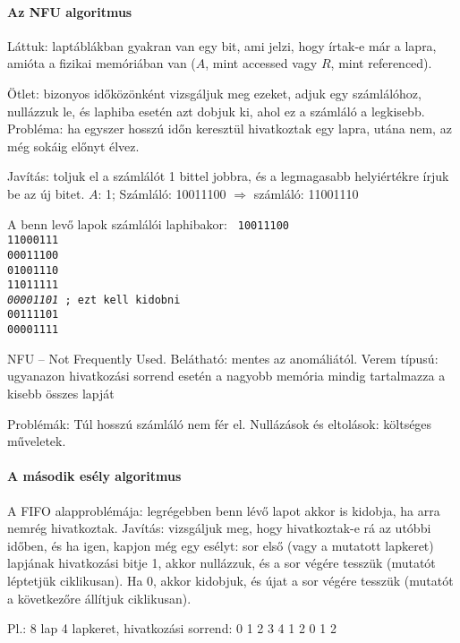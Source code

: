 \documentclass[fleqn,10pt,a4paper]{article}
\newcommand{\nn}{\Rightarrow}
\theoremstyle{magyar}
\begin{document}
  \paragraph{Az NFU algoritmus}
  
  Láttuk: laptáblákban gyakran van egy bit, ami jelzi, hogy írtak-e már a lapra, amióta a fizikai memóriában van ($A$,
  mint accessed vagy $R$, mint referenced).
  
  Ötlet: bizonyos időközönként vizsgáljuk meg ezeket, adjuk egy számlálóhoz, nullázzuk le, és laphiba esetén azt dobjuk
  ki, ahol ez a számláló a legkisebb. Probléma: ha egyszer hosszú időn keresztül hivatkoztak egy lapra, utána nem, az
  még sokáig előnyt élvez.


  Javítás: toljuk el a számlálót 1 bittel jobbra, és a legmagasabb helyiértékre írjuk be az új bitet.
  $A$: 1; Számláló: 10011100  $\nn$ számláló: 11001110
  
  A benn levő lapok számlálói laphibakor:
  \texttt{
    10011100\\
    11000111\\
    00011100\\
    01001110\\
    11011111\\
    \emph{00001101} ; ezt kell kidobni\\
    00111101\\
    00001111
  }
  
  NFU – Not Frequently Used. Belátható: mentes az anomáliától. Verem típusú: ugyanazon hivatkozási sorrend esetén a
  nagyobb memória mindig tartalmazza a kisebb összes lapját 

  Problémák: Túl hosszú számláló nem fér el. Nullázások és eltolások: költséges műveletek.

  \paragraph{A második esély algoritmus} A FIFO alapproblémája: legrégebben benn lévő lapot akkor is kidobja, ha arra nemrég hivatkoztak.
  Javítás: vizsgáljuk meg, hogy hivatkoztak-e rá az utóbbi időben, és ha igen, kapjon még egy esélyt: sor első (vagy a
  mutatott lapkeret) lapjának hivatkozási bitje 1, akkor nullázzuk, és a sor végére tesszük (mutatót léptetjük
  ciklikusan). Ha 0, akkor kidobjuk, és újat a sor végére tesszük (mutatót a következőre állítjuk ciklikusan).

  Pl.:
  8 lap 4 lapkeret, hivatkozási sorrend: 0 1 2 3 4 1 2 0 1 2 \\\\
\end{document}
